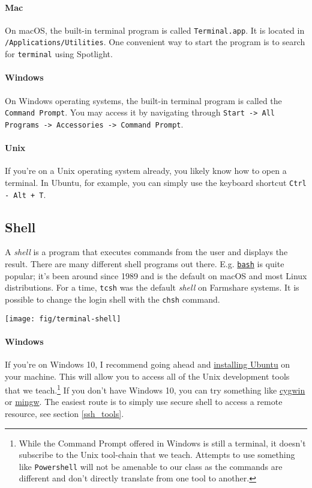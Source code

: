 \documentclass[12pt,letterpaper,twoside]{article}
\begin{document}
\paragraph{Mac}
On macOS, the built-in terminal program is called \texttt{Terminal.app}.  It is located
in \texttt{/Applications/Utilities}.  One convenient way to start the program is to
search for \texttt{terminal} using Spotlight.
\vspace{-12pt}
\paragraph{Windows} On Windows operating systems, the built-in terminal program is called the 
\texttt{Command Prompt}. You may access it by navigating through 
\texttt{Start -> All Programs -> Accessories -> Command Prompt}.
\vspace{-12pt}
\paragraph{Unix} If you're on a Unix operating system already, you likely know how to open 
a terminal. In Ubuntu, for example, you can simply use the keyboard shortcut \texttt{Ctrl - Alt + T}.

\subsection{Shell}
A \emph{shell} is a program that executes commands from the user and displays the
result.  There are many different shell programs out there.  E.g. \href{https://en.wikipedia.org/wiki/Bash_(Unix_shell)}{\texttt{bash}} is quite
popular; it's been around since 1989 and is the default on macOS and most Linux distributions.
For a time, \texttt{tcsh} was the default \emph{shell} on Farmshare systems. It is possible to change
the login shell with the \texttt{chsh} command.

\begin{center}
  \texttt{[image: fig/terminal-shell]}
\end{center}

\paragraph{Windows}
If you're on Windows 10, I recommend going ahead and 
\href{https://www.microsoft.com/en-us/p/ubuntu/9nblggh4msv6?activetab=pivot:overviewtab}
{installing Ubuntu} on your machine. This will allow you to access all of the Unix 
development tools that we teach.\footnote{While the Command Prompt offered in Windows is still a terminal, it doesn't subscribe to the Unix tool-chain that we teach. Attempts to use something like \texttt{Powershell} will not be amenable to our class as the commands are different and don't directly translate from one tool to another.} If you don't have Windows 10, you can try something like 
\href{https://www.cygwin.com/}{cygwin} or \href{http://www.mingw.org/}{mingw}. The easiest route is to simply use secure shell to access a remote resource, see section \ref{ssh_tools}.
\vspace{-8pt}
\end{document}
